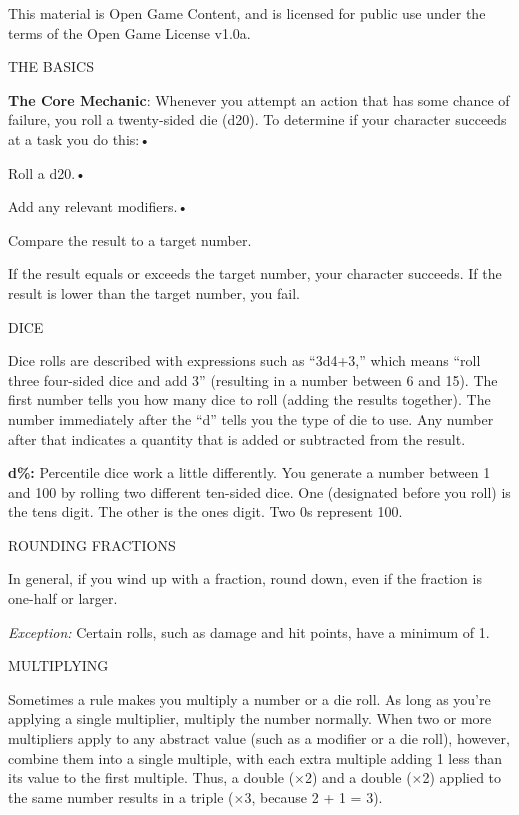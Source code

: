 \documentclass{article}
\begin{document}
This material is Open Game Content, and is licensed for public use under the terms 
of the Open Game License v1.0a.

{\LARGE{}THE BASICS}

\vspace{12pt}
\textbf{The Core Mechanic}: Whenever you attempt an action that has some chance 
of failure, you roll a twenty-sided die (d20). To determine if your character succeeds 
at a task you do this:• 

\parindent=3pt
Roll a d20.• 

Add any relevant modifiers.• 

\parindent=7pt
Compare the result to a target number.

\parindent=0pt
If the result equals or exceeds the target number, your character succeeds. If 
the result is lower than the target number, you fail.

\vspace{12pt}
DICE

Dice rolls are described with expressions such as ``3d4+3,'' which means ``roll 
three four-sided dice and add 3'' (resulting in a number between 6 and 15). The 
first number tells you how many dice to roll (adding the results together). The 
number immediately after the ``d'' tells you the type of die to use. Any number 
after that indicates a quantity that is added or subtracted from the result.

\vspace{12pt}
\textbf{d\%:} Percentile dice work a little differently. You generate a number 
between 1 and 100 by rolling two different ten-sided dice. One (designated before 
you roll) is the tens digit. The other is the ones digit. Two 0s represent 100.

\vspace{12pt}
ROUNDING FRACTIONS

In general, if you wind up with a fraction, round down, even if the fraction is 
one-half or larger.

\textit{Exception: }Certain rolls, such as damage and hit points, have a minimum 
of 1.

\vspace{12pt}
MULTIPLYING

Sometimes a rule makes you multiply a number or a die roll. As long as you're applying 
a single multiplier, multiply the number normally. When two or more multipliers 
apply to any abstract value (such as a modifier or a die roll), however, combine 
them into a single multiple, with each extra multiple adding 1 less than its value 
to the first multiple. Thus, a double (\ensuremath{\times}2) and a double (\ensuremath{\times}2) 
applied to the same number results in a triple (\ensuremath{\times}3, because 2 
+ 1 = 3).
\end{document}
